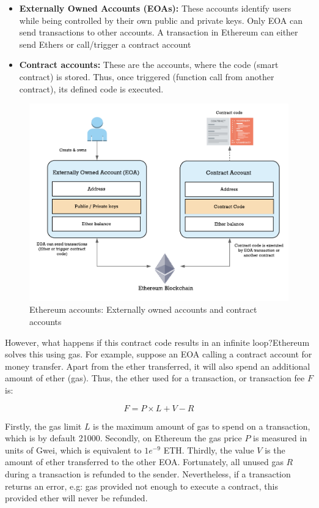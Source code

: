 \begin{itemize}
	
	\item \textbf{Externally Owned Accounts (EOAs):} These accounts identify users while being controlled by their own public and private keys. Only EOA can send transactions to other accounts. A transaction in Ethereum can either send Ethers or call/trigger a contract account  
	\item \textbf{Contract accounts:} These are the accounts, where the code (smart contract) is stored. Thus, once triggered (function call from another contract), its defined code is executed.
\end{itemize}

\begin{figure}[bth]
  \centering
  \includegraphics[width=0.6\linewidth]{gfx/ethereumAccounts}    
  \caption{Ethereum accounts: Externally owned accounts and contract 			accounts}
  \label{fig:EthereumAccounts}
\end{figure}

However, what happens if this contract code results in an infinite loop?Ethereum solves this using gas. For example, suppose an EOA calling a contract account for money transfer. Apart from the ether transferred, it will also spend an additional amount of ether (gas). Thus, the ether used for a transaction, or transaction fee $F$ is:

$$F = P \times L + V - R$$

Firstly, the gas limit $L$ is the maximum amount of gas to spend on a transaction, which is by default 21000. Secondly, on Ethereum the gas price $P$ is measured in units of Gwei, which is equivalent to $1e^{-9}$ ETH. Thirdly, the value $V$ is the amount of ether transferred to the other EOA. Fortunately, all unused gas $R$ during a transaction is refunded to the sender. Nevertheless, if a transaction returns an error, e.g: gas provided not enough to execute a contract, this provided ether will never be refunded. 

